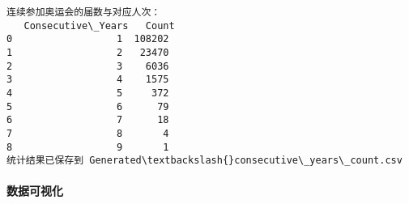 \documentclass[11pt]{article}
\begin{document}
    \begin{Verbatim}[commandchars=\\\{\}]
连续参加奥运会的届数与对应人次：
   Consecutive\_Years   Count
0                  1  108202
1                  2   23470
2                  3    6036
3                  4    1575
4                  5     372
5                  6      79
6                  7      18
7                  8       4
8                  9       1
统计结果已保存到 Generated\textbackslash{}consecutive\_years\_count.csv
    \end{Verbatim}

    \paragraph{数据可视化}\label{ux6570ux636eux53efux89c6ux5316}
\end{document}
